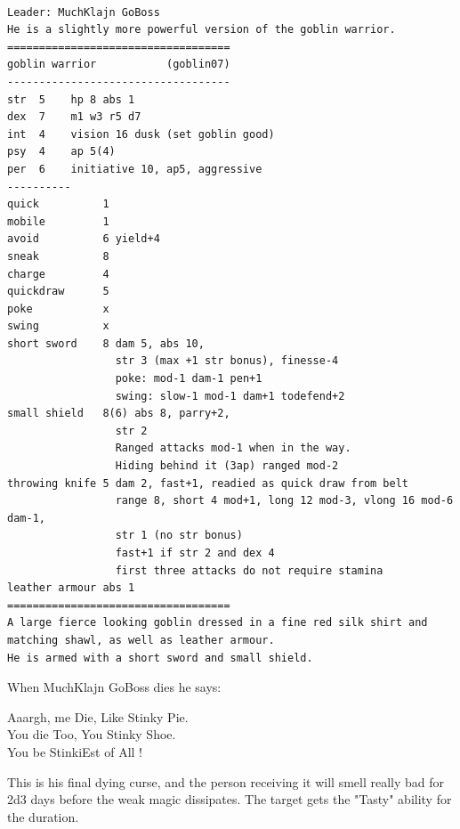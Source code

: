 \

\goodbreak \begin{samepage} \vsmall \begin{verbatim}
Leader: MuchKlajn GoBoss
He is a slightly more powerful version of the goblin warrior.
===================================
goblin warrior           (goblin07)
-----------------------------------
str  5    hp 8 abs 1
dex  7    m1 w3 r5 d7
int  4    vision 16 dusk (set goblin good)
psy  4    ap 5(4)
per  6    initiative 10, ap5, aggressive
----------
quick          1
mobile         1
avoid          6 yield+4
sneak          8
charge         4
quickdraw      5
poke           x
swing          x
short sword    8 dam 5, abs 10,
                 str 3 (max +1 str bonus), finesse-4
                 poke: mod-1 dam-1 pen+1
                 swing: slow-1 mod-1 dam+1 todefend+2
small shield   8(6) abs 8, parry+2,
                 str 2
                 Ranged attacks mod-1 when in the way.
                 Hiding behind it (3ap) ranged mod-2
throwing knife 5 dam 2, fast+1, readied as quick draw from belt
                 range 8, short 4 mod+1, long 12 mod-3, vlong 16 mod-6 dam-1,
                 str 1 (no str bonus)
                 fast+1 if str 2 and dex 4
                 first three attacks do not require stamina
leather armour abs 1
===================================
A large fierce looking goblin dressed in a fine red silk shirt and
matching shawl, as well as leather armour.
He is armed with a short sword and small shield.
\end{verbatim} \normalsize \end{samepage}

When MuchKlajn GoBoss dies he says:
\begin{readoutloud}
    Aaargh, me Die, Like Stinky Pie.\\
    You die Too, You Stinky Shoe.\\
    You be StinkiEst of All !
\end{readoutloud}
This is his final dying curse, and the person receiving it will smell
really bad for 2d3 days before the weak magic dissipates.
The target gets the "Tasty" ability for the duration.

\flushbottom
















